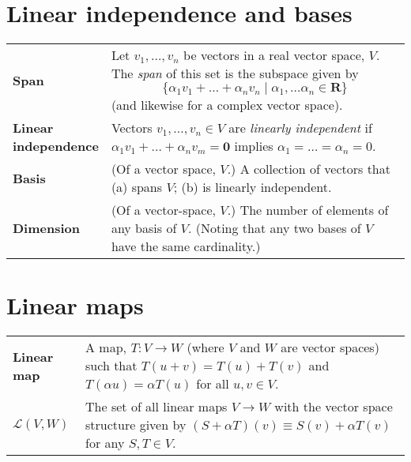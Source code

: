 \documentclass[10pt, a4paper, landscape]{article}
\newcommand{\defn}[1]{\textbf{#1}}
\newcommand{\set}[1]{\mathbold{#1}}
\begin{document}
\begin{multicols*}{3}
\begin{tabularx}{\columnwidth}{@{}l>{\raggedright\arraybackslash}X@{}}
  \\
\end{tabularx}

\section*{Linear independence and bases}
\begin{tabularx}{\columnwidth}{@{}l>{\raggedright\arraybackslash}X@{}}
  \toprule

  \defn{Span} & Let $v_1, \dots, v_n$ be vectors in a real vector space,
  $V$. The \emph{span} of this set is the subspace given by
  \begin{equation*}
    \{ \alpha_1 v_1 +\dots + \alpha_n v_n \mid \alpha_1, \dots \alpha_n\in\set{R} \}
  \end{equation*}
  (and likewise for a complex vector space). \\

  \parbox[t]{0.8in}{\defn{Linear\\ independence}} & Vectors $v_1, \dots, v_n \in V$ are \emph{linearly independent} if $\alpha_1 v_1 + \dots + \alpha_n v_m = \set{0}$ implies $\alpha_1 = \dots = \alpha_n=0$. \\

  \defn{Basis} & (Of a vector space, $V$.) A collection of vectors that (a) spans $V$; (b) is linearly independent. \\

  \defn{Dimension} & (Of a vector-space, $V$.) The number of elements of any basis of $V$. (Noting that any two bases of $V$ have the same cardinality.) \\
  
\end{tabularx}


\section*{Linear maps}
\begin{tabularx}{\columnwidth}{@{}l>{\raggedright\arraybackslash}X@{}}
  \toprule

  \defn{Linear map} & A map, $T\colon V\to W$ (where $V$ and $W$ are
  vector spaces) such that $T(u+v) = T(u)+T(v)$ and $T(\alpha u) = \alpha T(u)$
  for all $u,v\in V$. \\

  $\mathcal{L}(V, W)$ & The set of all linear maps $V\to W$ with the vector space structure given by $(S+\alpha T)(v) \equiv S(v)+\alpha T(v)$ for any $S,T\in V$. \\


\end{tabularx}
\end{multicols*}
\end{document}
